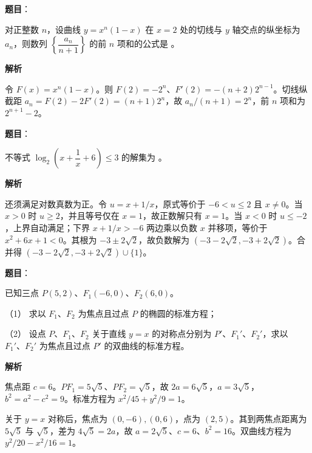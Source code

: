 \begin{answer}

\textbf{题目}：

对正整数 $n$，设曲线 $y=x^n(1-x)$ 在 $x=2$ 处的切线与 $y$ 轴交点的纵坐标为 $a_n$，则数列 $\left\{\dfrac{a_n}{n+1}\right\}$ 的前 $n$ 项和的公式是 \gkblank{}。

\textbf{解析}

令 $F(x)=x^n(1-x)$。则 $F(2)=-2^n$、$F'(2)=-(n+2)2^{n-1}$。切线纵截距 $a_n=F(2)-2F'(2)=(n+1)2^n$，故 $a_n/(n+1)=2^n$，前 $n$ 项和为 $2^{n+1}-2$。


\end{answer}
\begin{answer}

\textbf{题目}：

不等式 $\log_2\left(x+\dfrac1x+6\right)\leqslant3$ 的解集为 \gkblank{}。

\textbf{解析}

还须满足对数真数为正。令 $u=x+1/x$，原式等价于 $-6<u\le2$ 且 $x\ne0$。当 $x>0$ 时 $u\ge2$，并且等号仅在 $x=1$，故正数解只有 $x=1$。当 $x<0$ 时 $u\le-2$，上界自动满足；下界 $x+1/x>-6$ 两边乘以负数 $x$ 并移项，等价于 $x^2+6x+1<0$。其根为 $-3\pm2\sqrt2$，故负数解为 $(-3-2\sqrt2,-3+2\sqrt2)$。合并得 $(-3-2\sqrt2,-3+2\sqrt2)\cup\{1\}$。


\end{answer}
\begin{answer}

\textbf{题目}：

已知三点 $P(5,2)\text{、}F_1(-6,0)\text{、}F_2(6,0)$。

（1） 求以 $F_1\text{、}F_2$ 为焦点且过点 $P$ 的椭圆的标准方程；

（2） 设点 $P\text{、}F_1\text{、}F_2$ 关于直线 $y=x$ 的对称点分别为 $P'\text{、}F_1'\text{、}F_2'$，求以 $F_1'\text{、}F_2'$ 为焦点且过点 $P'$ 的双曲线的标准方程。

\textbf{解析}


焦点距 $c=6$。$PF_1=5\sqrt5$、$PF_2=\sqrt5$，故 $2a=6\sqrt5$，$a=3\sqrt5$，$b^2=a^2-c^2=9$。标准方程为 $x^2/45+y^2/9=1$。


关于 $y=x$ 对称后，焦点为 $(0,-6),(0,6)$，点为 $(2,5)$。其到两焦点距离为 $5\sqrt5$ 与 $\sqrt5$，差为 $4\sqrt5=2a$，故 $a=2\sqrt5$、$c=6$、$b^2=16$。双曲线方程为 $y^2/20-x^2/16=1$。



\end{answer}
